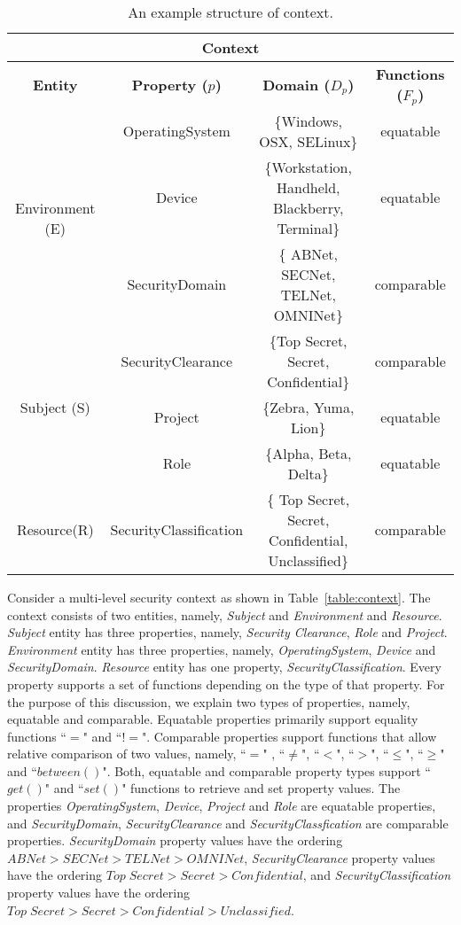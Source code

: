 \begin{table*}[t]
\caption{An example structure of context.}
\label{table:context}
\begin{center}
\begin{tabular}{|c|c|c|c|}
\hline
\multicolumn{4}{|c|}{ \bf Context}\\
\hline
{ \bf Entity} & {\bf Property ($p$)} & { \bf Domain ($D_p$)} & {\bf Functions ($F_p$)}\\
\hline
\multirow{3}{*}{Environment (E)} & OperatingSystem & \{Windows, OSX, SELinux\}&  equatable\\
                                                    & Device & \{Workstation, Handheld, Blackberry, Terminal\} & equatable \\
                                                    & SecurityDomain & \{ ABNet, SECNet, TELNet, OMNINet\} & comparable\\ 
\hline
\multirow{3}{*}{Subject (S)} & SecurityClearance & \{Top Secret, Secret, Confidential\} &  comparable\\
				      &Project & \{Zebra, Yuma, Lion\} & equatable\\
				       &Role & \{Alpha, Beta, Delta\} & equatable\\

\hline
 Resource(R) & SecurityClassification & \{ Top Secret, Secret, Confidential, Unclassified\} & comparable \\
\hline

\end{tabular}
\end{center}
\label{default}
\end{table*} 

Consider a multi-level security context as shown in Table~\ref{table:context}. The context consists of two entities, namely, {\em Subject} and {\em Environment} and {\em Resource}. {\em Subject} entity has three properties, namely, {\em Security Clearance}, {\em Role} and {\em Project}. {\em Environment} entity has three properties, namely, {\em OperatingSystem}, {\em Device} and {\em SecurityDomain}. {\em Resource} entity has one property, {\em SecurityClassification}. Every property supports a set of functions depending on the type of that property. For the purpose of this discussion, we explain two types of properties, namely, equatable and comparable. Equatable properties primarily support equality functions  ``$=$" and ``$!=$". Comparable properties support functions that allow relative comparison of two values, namely, ``$=$" , ``$\ne$", ``$<$", ``$>$",  ``$\leq$", ``$\geq$" and ``$between()$". Both, equatable and comparable property types support ``$get()$" and ``$set()$" functions to retrieve and set property values. The properties {\em OperatingSystem}, {\em Device}, {\em Project} and {\em Role} are equatable properties, and {\em SecurityDomain}, {\em SecurityClearance} and {\em SecurityClassfication} are comparable properties. {\em SecurityDomain} property values have the ordering $ABNet > SECNet > TELNet > OMNINet$,  {\em SecurityClearance} property values have the ordering $Top\;Secret > Secret > Confidential$, and {\em SecurityClassification} property values have the ordering $Top\;Secret > Secret > Confidential > Unclassified$. 

